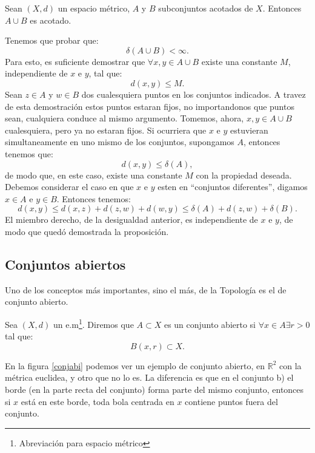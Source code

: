 \begin{proposicion}{} Sean $(X,d)$ un espacio métrico, $A$ y $B$
subconjuntos acotados de $X$. Entonces $A\cup B$ es acotado.
\end{proposicion}
\begin{demo}  Tenemos que probar que:
	\[\delta(A\cup B)<\infty.\]
Para esto, es suficiente demostrar que $\forall x,y\in A\cup B$
existe una constante $M$, independiente de $x$ e $y$, tal que:
\[d(x,y)\leq M.\]
Sean $z\in A$ y $w\in B$ dos cualesquiera puntos en los conjuntos
indicados. A travez de esta demostración estos puntos estaran
fijos, no importandonos que puntos sean, cualquiera conduce al
mismo argumento. Tomemos, ahora, $x,y\in A\cup B$ cualesquiera,
pero ya no estaran fijos. Si ocurriera que $x$ e $y$ estuvieran
simultaneamente en uno mismo de los conjuntos, supongamos $A$,
entonces tenemos que:
\[d(x,y)\leq \delta(A),\]
de modo que, en este caso, existe una constante $M$ con la
propiedad deseada. Debemos considerar el caso en que $x$ e $y$
esten en ``conjuntos diferentes'', digamos $x\in A$ e $y\in B$.
Entonces tenemos:
\[
	d(x,y)\leq d(x,z)+d(z,w)+d(w,y)\leq \delta(A)+d(z,w)+\delta(B).
\]
El miembro derecho, de la desigualdad anterior, es independiente
de $x$ e $y$, de modo que quedó demostrada la  proposición.
\end{demo}

\subsection{Conjuntos abiertos} Uno de los conceptos
más importantes, sino el más, de la Topología es el de
conjunto abierto.
\begin{definicion}{} Sea $(X,d)$ un e.m\footnote{Abreviación para espacio
métrico}. Diremos que $A\subset X$ es un conjunto abierto si
$\forall x\in A\exists r>0$ tal que:
\[
	B(x,r)\subset X.
\]
\end{definicion}
En la figura \vref{conjabi} podemos ver un ejemplo de conjunto
abierto, en $\mathbb{R}^2$ con la métrica euclidea, y otro que
no lo es. La diferencia es que en el conjunto b) el borde (en la
parte recta del conjunto) forma parte del mismo conjunto, entonces
si $x$ está en este borde, toda bola centrada en $x$ contiene
puntos fuera del conjunto.


